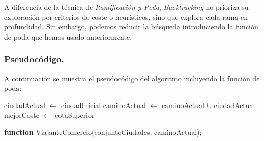 \documentclass[11pt,a4paper]{article}
\begin{document}
			\par
			A diferencia de la técnica de \textit{Ramificación y Poda}, \textit{Backtracking} no prioriza su exploración por criterios de coste o heurísticos, sino que explora cada rama en profundidad. Sin embargo, podemos reducir la búsqueda introduciendo la función de poda que hemos usado anteriormente.

			\subsubsection{Pseudocódigo.}

				\par
				A continuación se muestra el pseudocódigo del algoritmo incluyendo la función de poda:

				\vspace{2mm}

				\begin{algorithm}[H]

					ciudadActual $\longleftarrow$ ciudadInicial\;
					caminoActual $\longleftarrow$ caminoActual $\cup$ ciudadActual\;
					mejorCoste $\longleftarrow$ cotaSuperior\;

					\textbf{function} ViajanteComercio(conjuntoCiudades, caminoActual);


				\end{algorithm}

\newpage
\end{document}

